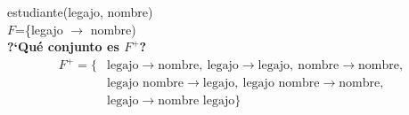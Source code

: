 \documentclass[preview]{standalone}
\begin{document}
estudiante(legajo, nombre)\\
$F$=\{legajo $\rightarrow$ nombre)\\

\textbf{?`Qu\'e conjunto es $F^+$?}\\
\begin{align*}
	F^+ = \big\{ & \text{legajo} \rightarrow \text{nombre},\ \text{legajo} \rightarrow \text{legajo},\ \text{nombre} \rightarrow \text{nombre},\\
 & \text{legajo nombre} \rightarrow \text{legajo},\ \text{legajo nombre} \rightarrow \text{nombre},\\  
 & \text{legajo} \rightarrow \text{nombre legajo}\big\}   
\end{align*}
\end{document}
